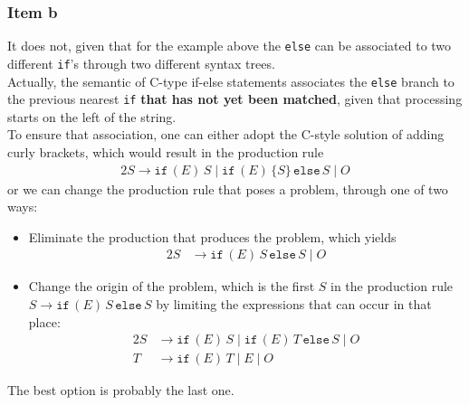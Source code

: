 {\subsubsection{Item b}
It does not, given that for the example above the \texttt{else} can be associated to two different \texttt{if}'s through two different syntax trees.\\
Actually, the semantic of C-type if-else statements associates the \texttt{else} branch to the previous nearest \texttt{if} \textbf{that has not yet been matched}, given that processing starts on the left of the string.\\
To ensure that association, one can either adopt the C-style solution of adding curly brackets, which would result in the production rule
\begin{alignat*}{2}
	S \rightarrow \mathtt{if}\,(E)\,S\mid \mathtt{if}\,(E)\,\{S\}\,\mathtt{else}\,S\mid O
\end{alignat*}
or we can change the production rule that poses a problem, through one of two ways:
\begin{itemize}
	\item Eliminate the production that produces the problem, which yields
	\begin{alignat*}{2}
		S &\rightarrow \mathtt{if}\,(E)\,S\,\mathtt{else}\,S\mid O
	\end{alignat*}
	\item Change the origin of the problem, which is the first $S$ in the production rule $S \rightarrow \mathtt{if}\,(E)\,S\,\mathtt{else}\,S$ by limiting the expressions that can occur in that place:
	\begin{alignat*}{2}
		S &\rightarrow \mathtt{if}\,(E)\,S\mid \mathtt{if}\,(E)\,T\,\mathtt{else}\,S\mid O\\
		T &\rightarrow \mathtt{if}\,(E)\,T\mid E \mid  O 
	\end{alignat*}
\end{itemize}
The best option is probably the last one.
}
